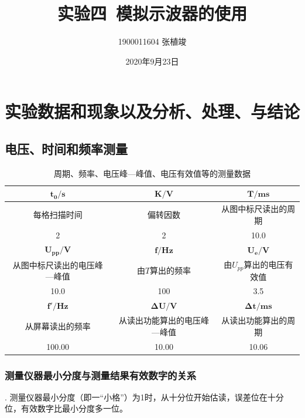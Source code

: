 \documentclass[12pt]{ctexart}
\begin{document}
\title{\textbf{实验四\ 模拟示波器的使用}}
\author{1900011604 张植竣}
\date{2020年9月23日}

\maketitle

\section{实验数据和现象以及分析、处理、与结论}

\subsection{电压、时间和频率测量}

\begin{table}[ht!]
	\begin{center}
		\begin{tabular}{|c|c|c|}
			\hline
			$\boldsymbol{t_0}\mathbf{/s}$ & $\boldsymbol{K}\mathbf{/V}$ & $\boldsymbol{T}\mathbf{/ms}$ \\
			\hline
			每格扫描时间 & 偏转因数 & 从图中标尺读出的周期 \\
			\hline
			2 & 2 & 10.0 \\
			\hline
			$\boldsymbol{U_{pp}}\mathbf{/V}$ & $\boldsymbol{f}\mathbf{/Hz}$ & $\boldsymbol{U_e}\mathbf{/V}$ \\
			\hline
			从图中标尺读出的电压峰—峰值 & 由$T$算出的频率 & 由$U_{pp}$算出的电压有效值 \\
			\hline
			10.0 & 100 & 3.5 \\
			\hline
			$\boldsymbol{f'}\mathbf{/Hz}$ & $\boldsymbol{\Delta U}\mathbf{/V}$ & $\boldsymbol{\Delta t}\mathbf{/ms}$\\
			\hline
			从屏幕读出的频率 & 从读出功能算出的电压峰—峰值 & 从读出功能算出的周期 \\
			\hline
			100.00 & 10.00 & 10.06 \\
			\hline
		\end{tabular}
		\caption{周期、频率、电压峰—峰值、电压有效值等的测量数据}
	\end{center}
\end{table}

\subsubsection*{测量仪器最小分度与测量结果有效数字的关系}

. 测量仪器最小分度（即一“小格”）为1时，从十分位开始估读，误差位在十分位，有效数字比最小分度多一位。
\end{document}
